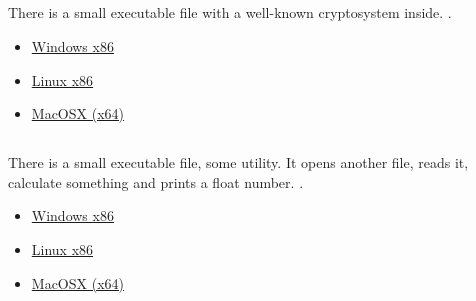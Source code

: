 

\subsection{}

{There is a small executable file with a well-known cryptosystem inside}.
.

\begin{itemize}
\item
\href{http://yurichev.com/RE-exercises/middle/2/unknown_cryptosystem.exe}{Windows x86}

\item
\href{http://yurichev.com/RE-exercises/middle/2/unknown_encryption_linux86.tar}{Linux x86}

\item
\href{http://yurichev.com/RE-exercises/middle/2/unknown_encryption_MacOSX.tar}{MacOSX (x64)}
\end{itemize}

\subsection{}

{There is a small executable file, some utility}.
{It opens another file, reads it, calculate something and prints a float number}.
.

\begin{itemize}
\item
\href{http://yurichev.com/RE-exercises/middle/3/unknown_utility_2_3.exe}{Windows x86}

\item
\href{http://yurichev.com/RE-exercises/middle/3/unknown_utility_2_3_Linux86.tar}{Linux x86}

\item
\href{http://yurichev.com/RE-exercises/middle/3/unknown_utility_2_3_MacOSX.tar}{MacOSX (x64)}
\end{itemize}

\subsection{}

